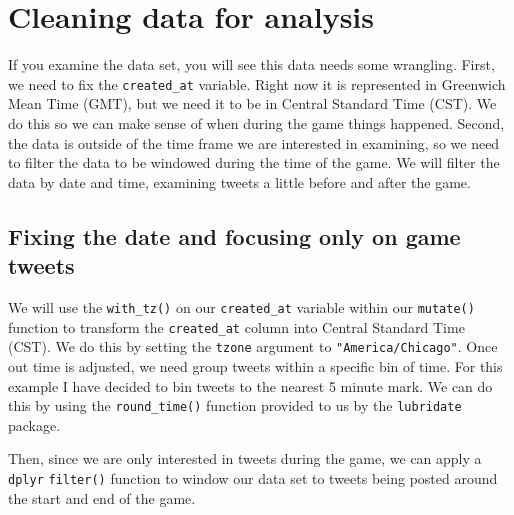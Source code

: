 \documentclass[
]{book}
\newenvironment{Shaded}{\begin{snugshade}}{\end{snugshade}}
\newcommand{\DataTypeTok}[1]{\textcolor[rgb]{0.13,0.29,0.53}{#1}}
\newcommand{\KeywordTok}[1]{\textcolor[rgb]{0.13,0.29,0.53}{\textbf{#1}}}
\newcommand{\NormalTok}[1]{#1}
\newcommand{\OperatorTok}[1]{\textcolor[rgb]{0.81,0.36,0.00}{\textbf{#1}}}
\newcommand{\StringTok}[1]{\textcolor[rgb]{0.31,0.60,0.02}{#1}}
\begin{document}
\hypertarget{cleaning-data-for-analysis}{%
\section{Cleaning data for analysis}\label{cleaning-data-for-analysis}}

If you examine the data set, you will see this data needs some wrangling. First, we need to fix the \texttt{created\_at} variable. Right now it is represented in Greenwich Mean Time (GMT), but we need it to be in Central Standard Time (CST). We do this so we can make sense of when during the game things happened. Second, the data is outside of the time frame we are interested in examining, so we need to filter the data to be windowed during the time of the game. We will filter the data by date and time, examining tweets a little before and after the game.

\hypertarget{fixing-the-date-and-focusing-only-on-game-tweets}{%
\subsection{Fixing the date and focusing only on game tweets}\label{fixing-the-date-and-focusing-only-on-game-tweets}}

We will use the \texttt{with\_tz()} on our \texttt{created\_at} variable within our \texttt{mutate()} function to transform the \texttt{created\_at} column into Central Standard Time (CST). We do this by setting the \texttt{tzone} argument to \texttt{"America/Chicago"}. Once out time is adjusted, we need group tweets within a specific bin of time. For this example I have decided to bin tweets to the nearest 5 minute mark. We can do this by using the \texttt{round\_time()} function provided to us by the \texttt{lubridate} package.

Then, since we are only interested in tweets during the game, we can apply a \texttt{dplyr} \texttt{filter()} function to window our data set to tweets being posted around the start and end of the game.

\begin{Shaded}
\end{Shaded}
\end{document}

